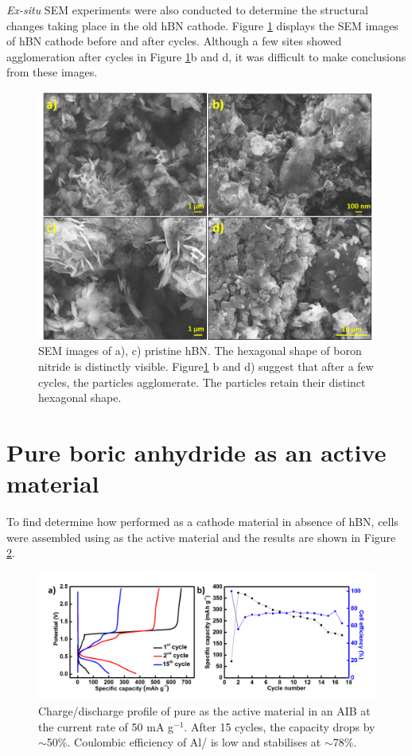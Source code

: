 \textit{Ex-situ} SEM experiments were also conducted to determine the structural changes taking place in the old hBN cathode. Figure \ref{Figures/BOhBN:hBNSEM} displays the SEM images of hBN cathode before and after cycles. Although a few sites showed agglomeration after cycles in Figure \ref{Figures/BOhBN:hBNSEM}b and d, it was difficult to make conclusions from these images.

\begin{figure}[tbh!]
\centering
\includegraphics[width=\textwidth]{Figures/BOhBN/hBNSEM}
\caption{SEM images of a), c) pristine hBN. The hexagonal shape of boron nitride is distinctly visible. Figure\ref{Figures/BOhBN:hBNSEM} b and d) suggest that after a few cycles, the particles agglomerate. The particles retain their distinct hexagonal shape.}
\label{Figures/BOhBN:hBNSEM}
\end{figure}



\section*{Pure boric anhydride  as an active material}
To find determine how  performed as a cathode material in absence of hBN, cells were assembled using  as the active material and the results are shown in Figure \ref{Figures/BOhBN:BOCDC}. 

\begin{figure}[tbh!]
\centering
\includegraphics[width=\textwidth]{Figures/BOhBN/BOCDC}
\caption{Charge/discharge profile of pure  as the active material in an AIB at the current rate of 50 mA g$^{-1}$. After 15 cycles, the capacity drops by $\sim$50\%. Coulombic efficiency of Al/ is low and  stabilises at $\sim$78\%.}
\label{Figures/BOhBN:BOCDC}
\end{figure}

